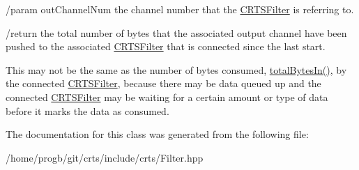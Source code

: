 /param out\+Channel\+Num the channel number that the \hyperlink{classCRTSFilter}{C\+R\+T\+S\+Filter} is referring to.

/return the total number of bytes that the associated output channel have been pushed to the associated \hyperlink{classCRTSFilter}{C\+R\+T\+S\+Filter} that is connected since the last start.

This may not be the same as the number of bytes consumed, \hyperlink{classCRTSControl_ad9acd9abb7620a0b34b724b26a47740d}{total\+Bytes\+In()}, by the connected \hyperlink{classCRTSFilter}{C\+R\+T\+S\+Filter}, because there may be data queued up and the connected \hyperlink{classCRTSFilter}{C\+R\+T\+S\+Filter} may be waiting for a certain amount or type of data before it marks the data as consumed. 

The documentation for this class was generated from the following file\+:\begin{DoxyCompactItemize}
\item 
/home/progb/git/crts/include/crts/Filter.\+hpp\end{DoxyCompactItemize}
